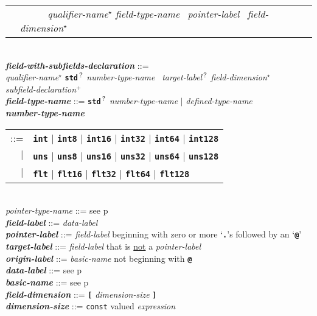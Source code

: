 \documentclass[12pt]{article}
\newcommand{\TT}[1]{{\tt \bfseries #1}}
\newcommand{\STAR}{{\Large $^\star$}}
\newcommand{\PLUS}[1][]{{$^{+#1}$}}
\newcommand{\QMARK}{{$^{\,\mbox{\footnotesize ?}}$}}
\newcommand{\ttkey}[1]{{\tt \bfseries #1}}
\newcommand{\emkey}[1]{{\em \bfseries #1}}
\newcommand{\pagref}[1]{p\pageref{#1}}
\newenvironment{indpar}[1][0.3in]%
	{\begin{list}{}%
		     {\setlength{\itemsep}{0in}%
		      \setlength{\topsep}{0in}%
		      \setlength{\parsep}{1ex}%
		      \setlength{\labelwidth}{#1}%
		      \setlength{\leftmargin}{#1}%
		      \addtolength{\leftmargin}{\labelsep}}%
	 \item}%
	{\end{list}}
\begin{document}
\begin{indpar}
\begin{tabular}{rl}
        & ~~~~~ {\em qualifier-name}\STAR{} {\em field-type-name}~
                {\em pointer-label}~ {\em field-dimension}\STAR{}
	\end{tabular}
\\[2ex]
\emkey{field-with-subfields-declaration} ::= \\
\hspace*{0.5in}
    {\em qualifier-name}\STAR{}
    \TT{std}\QMARK{} {\em number-type-name}~ {\em target-label}\QMARK{}
                {\em field-dimension}\STAR{} \\
\hspace*{0.5in}
    {\em subfield-declaration}\PLUS{}
\\[2ex]
\emkey{field-type-name} ::= \TT{std}\QMARK{} {\em number-type-name}
                        $|$ {\em defined-type-name} \\
\emkey{number-type-name}
    \begin{tabular}[t]{@{}rl}
    ::= &  \ttkey{int} $|$ \ttkey{int8} $|$ \ttkey{int16} $|$ \ttkey{int32}
                       $|$ \ttkey{int64} $|$ \ttkey{int128} \\
    $|$ &  \ttkey{uns} $|$ \ttkey{uns8} $|$ \ttkey{uns16} $|$ \ttkey{uns32}
                       $|$ \ttkey{uns64} $|$ \ttkey{uns128} \\
    $|$ &  \ttkey{flt} $|$ \ttkey{flt16} $|$ \ttkey{flt32} $|$ \ttkey{flt64}
                         $|$ \ttkey{flt128} \\
    \end{tabular} \\
{\em pointer-type-name} ::= see \pagref{POINTER-TYPE-NAME}
\\[2ex]
\emkey{field-label}\label{FIELD-LABEL} ::=  {\em data-label} \\
\emkey{pointer-label}\label{POINTER-LABEL} ::=
    {\em field-label} beginning with zero or more `\TT{.}'s followed by
    an `\TT{@}' \\
\emkey{target-label}\label{TARGET-LABEL} ::=
    {\em field-label} that is \underline{not} a {\em pointer-label} \\
\emkey{origin-label}\label{ORIGIN-LABEL} ::=
    {\em basic-name} not beginning with \TT{@} \\
\emkey{data-label} ::=  see \pagref{DATA-LABEL} \\
\emkey{basic-name} ::=  see \pagref{BASIC-NAME}
\\[2ex]
\emkey{field-dimension} ::=  \TT{[} {\em dimension-size} \TT{]} \\
\emkey{dimension-size} ::=  {\tt const} valued {\em expression}

\end{indpar}
\end{document}
